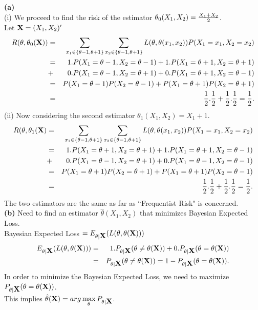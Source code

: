 \documentclass[12pt]{article}
\def\frac#1#2{{{#1}\over{#2}}}
\def\X   {\hbox{\bf X}}
\begin{document}
\textbf{(a)} \\(i) We proceed to find the risk of the estimator $\theta_0(X_1,X_2)=\frac{X_1+X_2}{2}$. \\
Let $\X=(X_1,X_2)'$
\begin{eqnarray}
  R(\theta,\theta_0(\X)) &=& \sum_{x_1\in\{\theta-1,\theta+1\}}\sum_{x_2\in\{\theta-1,\theta+1\}}L(\theta,\theta(x_1,x_2))P(X_1=x_1,X_2=x_2)\nonumber\\
&=& 1. P(X_1=\theta-1,X_2=\theta-1)+1.P(X_1=\theta+1,X_2=\theta+1)\nonumber\\
&+& 0.P(X_1=\theta-1,X_2=\theta+1)+0.P(X_1=\theta+1,X_2=\theta-1)\nonumber\\
&=& P(X_1=\theta-1)P(X_2=\theta-1)+P(X_1=\theta+1)P(X_2=\theta+1)\nonumber\\
&=& \frac{1}{2}.\frac{1}{2}+\frac{1}{2}.\frac{1}{2}=\frac{1}{2}.
\end{eqnarray}
(ii) Now considering the second estimator $\theta_1(X_1,X_2)=X_1+1$.
\begin{eqnarray}
R(\theta,\theta_1(\X) &=& \sum_{x_1\in\{\theta-1,\theta+1\}}\sum_{x_2\in\{\theta-1,\theta+1\}}L(\theta,\theta(x_1,x_2))P(X_1=x_1,X_2=x_2)\nonumber\\
&=& 1. P(X_1=\theta+1,X_2=\theta+1)+1.P(X_1=\theta+1,X_2=\theta-1)\nonumber\\
&+& 0.P(X_1=\theta-1,X_2=\theta+1)+0.P(X_1=\theta-1,X_2=\theta-1)\nonumber\\
&=& P(X_1=\theta+1)P(X_2=\theta+1)+P(X_1=\theta+1)P(X_2=\theta-1)\nonumber\\
&=& \frac{1}{2}.\frac{1}{2}+\frac{1}{2}.\frac{1}{2}=\frac{1}{2}.
\end{eqnarray}
The two estimators are the same as far as ``Frequentist Risk" is concerned.\\



\textbf{(b)} Need to find an estimator $\hat{\theta}(X_1,X_2)$ that minimizes Bayesian Expected Loss. \\

Bayesian Expected Loss $=E_{\theta|\X}(L(\theta,\theta(\X)))$
\begin{eqnarray}
E_{\theta|\X}(L(\theta,\theta(\X))) &=& 1. P_{\theta|\X}(\theta\neq \theta(\X))+0. P_{\theta|\X}(\theta=\theta(\X))\\
&=& P_{\theta|\X}(\theta\neq \theta(\X))=1-P_{\theta|\X}(\theta=\theta(\X)).
\end{eqnarray}
In order to minimize the Bayesian Expected Loss, we need to maximize \\
$P_{\theta|\X}(\theta=\theta(\X))$. \\
This implies
$\hat{\theta}(\X)=arg\max\limits_{\theta} P_{\theta|\X}$. \\
\end{document}
